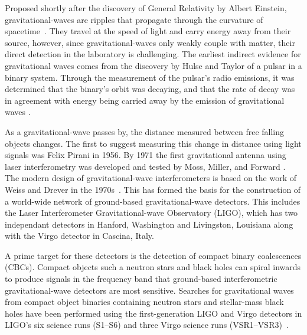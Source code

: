Proposed shortly after the discovery of General Relativity by Albert Einstein, 
gravitational-waves are ripples that propagate through the
curvature of spacetime~\cite{einstein1916sb}. They travel at the speed of light 
and carry energy away from their source, however,
since gravitational-waves only weakly couple with matter, their direct detection 
in the laboratory is challenging. The earliest indirect evidence for
gravitational waves comes from the discovery
by Hulse and Taylor of a pulsar in a binary system. Through the measurement 
of the pulsar's radio emissions, it was determined that the binary's orbit was
decaying, and that the rate of decay was in agreement with energy 
being carried away by the emission of gravitational waves \cite{Hulse:1974eb, Weisberg:1981mt}. 

As a gravitational-wave passes by, the distance measured between free falling
objects changes. The first to suggest measuring this change in 
distance using light signals was Felix Pirani in 1956. By 1971 the first
gravitational antenna using laser interferometry was developed and 
tested by Moss, Miller, and Forward \cite{Forward:1971}. The modern design
of gravitational-wave interferometers is based on the work of Weiss and Drever
in the 1970s~\cite{Weiss:1972, Drever:1980}. This has formed the basis for the
construction of a world-wide network of ground-based gravitational-wave detectors. This includes
the Laser Interferometer Gravitational-wave Observatory (LIGO), which has
two independant detectors in Hanford, Washington and Livingston, Louisiana along
with the Virgo detector in Cascina, Italy. 

A prime target for these detectors is the detection of compact binary coalescences (CBCs).
Compact objects such a neutron stars and black holes can spiral
inwards to produce signals in the frequency band that ground-based interferometric
gravitational-wave detectors are most sensitive. Searches for gravitational waves from compact object
binaries containing neutron stars and stellar-mass black holes have been
performed using the first-generation LIGO and Virgo detectors in LIGO's six
science runs (S1--S6) and three Virgo science runs
(VSR1--VSR3)~\cite{Abbott:2003pj,Abbott:2005pe,Abbott:2005kq,Abbott:2007xi,Abbott:2007ai,Abbott:2009tt,Abbott:2009qj,Abadie:2010yba,Abadie:2011nz}.

